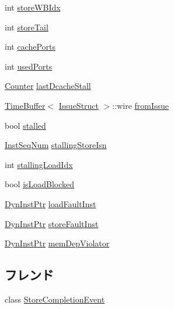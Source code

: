\begin{DoxyCompactItemize}
\item 
int \hyperlink{classOzoneLSQ_a9023e0813d4f3e566d17fb6334a2da02}{storeWBIdx}
\item 
int \hyperlink{classOzoneLSQ_acd5c7fbb5578b5cb505ffff16bbf6a8b}{storeTail}
\item 
int \hyperlink{classOzoneLSQ_ab2e23636971c40e7ed945026b2a184e1}{cachePorts}
\item 
int \hyperlink{classOzoneLSQ_a03435d626b7567ed154de5d7d8c3d419}{usedPorts}
\item 
\hyperlink{base_2types_8hh_ae1475755791765b8e6f6a8bb091e273e}{Counter} \hyperlink{classOzoneLSQ_a8b4696062ef09ab956804a7a99491853}{lastDcacheStall}
\item 
\hyperlink{classTimeBuffer}{TimeBuffer}$<$ \hyperlink{structIssueStruct}{IssueStruct} $>$::wire \hyperlink{classOzoneLSQ_af6f43373b6586aa8c486538fb076effb}{fromIssue}
\item 
bool \hyperlink{classOzoneLSQ_a6f8bff553ad30865c7d0c62e05421eb8}{stalled}
\item 
\hyperlink{inst__seq_8hh_a258d93d98edaedee089435c19ea2ea2e}{InstSeqNum} \hyperlink{classOzoneLSQ_afe1cdcfca6b44c28581d862228adc3da}{stallingStoreIsn}
\item 
int \hyperlink{classOzoneLSQ_af55bc9000c8b4e4cfcfbd018feca12a7}{stallingLoadIdx}
\item 
bool \hyperlink{classOzoneLSQ_a95dc31b4ce3ebcb6b9d75a510b3a128c}{isLoadBlocked}
\item 
\hyperlink{classOzoneLSQ_a028ce10889c5f6450239d9e9a7347976}{DynInstPtr} \hyperlink{classOzoneLSQ_a7123aa8b10829cc4712dff5454e13978}{loadFaultInst}
\item 
\hyperlink{classOzoneLSQ_a028ce10889c5f6450239d9e9a7347976}{DynInstPtr} \hyperlink{classOzoneLSQ_ab98cf7d5235b7402e8916e78569f4ab2}{storeFaultInst}
\item 
\hyperlink{classOzoneLSQ_a028ce10889c5f6450239d9e9a7347976}{DynInstPtr} \hyperlink{classOzoneLSQ_a270a20c3fa52139e0538288275db9d22}{memDepViolator}
\end{DoxyCompactItemize}
\subsection*{フレンド}
\begin{DoxyCompactItemize}
\item 
class \hyperlink{classOzoneLSQ_a8f5ca1839f53a90564710f1349dd0199}{StoreCompletionEvent}
\end{DoxyCompactItemize}



